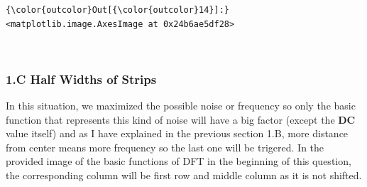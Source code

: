 \documentclass[11pt]{article}
\begin{document}
\begin{Verbatim}[commandchars=\\\{\}]
{\color{outcolor}Out[{\color{outcolor}14}]:} <matplotlib.image.AxesImage at 0x24b6ae5df28>
\end{Verbatim}
            
    \begin{center}
    \end{center}
    { \hspace*{\fill} \\}
    
    \hypertarget{c-half-widths-of-strips}{%
\subsubsection{1.C Half Widths of
Strips}\label{c-half-widths-of-strips}}

In this situation, we maximized the possible noise or frequency so only
the basic function that represents this kind of noise will have a big
factor (except the \textbf{DC} value itself) and as I have explained in
the previous section 1.B, more distance from center means more frequency
so the last one will be trigered. In the provided image of the basic
functions of DFT in the beginning of this question, the corresponding
column will be first row and middle column as it is not shifted.
\end{document}
